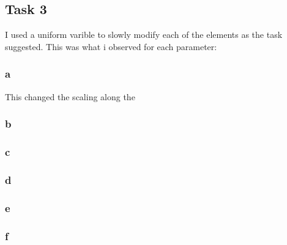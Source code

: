 \subsection{Task 3}
I used a uniform varible to slowly modify each of the elements as the task suggested. This was what i observed for each parameter:

\subsubsection{a}
This changed the scaling along the 
\subsubsection{b}

\subsubsection{c}
\subsubsection{d}
\subsubsection{e}
\subsubsection{f}
